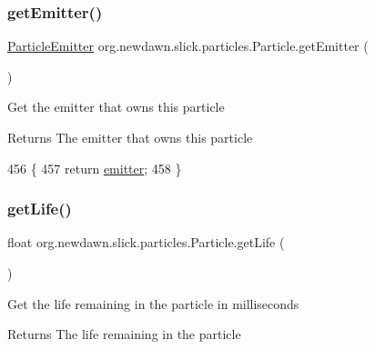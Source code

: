 \subsubsection{\texorpdfstring{get\+Emitter()}{getEmitter()}}
{\footnotesize\ttfamily \mbox{\hyperlink{interfaceorg_1_1newdawn_1_1slick_1_1particles_1_1_particle_emitter}{Particle\+Emitter}} org.\+newdawn.\+slick.\+particles.\+Particle.\+get\+Emitter (\begin{DoxyParamCaption}{ }\end{DoxyParamCaption})\hspace{0.3cm}{\ttfamily [inline]}}

Get the emitter that owns this particle

\begin{DoxyReturn}{Returns}
The emitter that owns this particle 
\end{DoxyReturn}

\begin{DoxyCode}
456                                         \{
457         \textcolor{keywordflow}{return} \mbox{\hyperlink{classorg_1_1newdawn_1_1slick_1_1particles_1_1_particle_a1293f2f734f0862d1263330c0d9c77c9}{emitter}};
458     \}
\end{DoxyCode}
\mbox{\label{classorg_1_1newdawn_1_1slick_1_1particles_1_1_particle_a0fd4bc1fea71825b1e95796ad014ab82}} 
\subsubsection{\texorpdfstring{get\+Life()}{getLife()}}
{\footnotesize\ttfamily float org.\+newdawn.\+slick.\+particles.\+Particle.\+get\+Life (\begin{DoxyParamCaption}{ }\end{DoxyParamCaption})\hspace{0.3cm}{\ttfamily [inline]}}

Get the life remaining in the particle in milliseconds

\begin{DoxyReturn}{Returns}
The life remaining in the particle 
\end{DoxyReturn}

